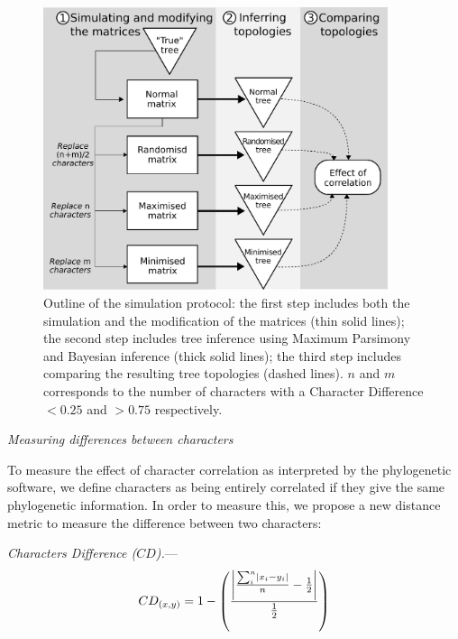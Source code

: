 \documentclass[12pt,letterpaper]{article}
\DeclarePairedDelimiter\abs{\lvert}{\rvert}%
\renewcommand{\subsection}[1]{%
\bigskip
\begin{center}
\begin{large}
\normalfont\itshape #1
\end{large}
\end{center}}
\renewcommand{\subsubsection}[1]{%
\vspace{2ex}
\noindent
\textit{#1.}---}
\begin{document}
\begin{figure}[!htbp]
\centering
   \includegraphics[width=0.9\textwidth]{Figures/outline.pdf}
\caption{Outline of the simulation protocol: the first step includes both the simulation and the modification of the matrices (thin solid lines); the second step includes tree inference using Maximum Parsimony and Bayesian inference (thick solid lines); the third step includes comparing the resulting tree topologies (dashed lines). $n$ and $m$ corresponds to the number of characters with a Character Difference $<0.25$ and $>0.75$ respectively.}
\label{Fig:outline}
\end{figure}

\subsection{Measuring differences between characters}
\label{CD_description}
To measure the effect of character correlation as interpreted by the phylogenetic software, we define characters as being entirely correlated if they give the same phylogenetic information.
In order to measure this, we propose a new distance metric to measure the difference between two characters:

\subsubsection{Characters Difference ($CD$)}
\begin{equation}
    CD_{(x,y)} = 1 - \left(\frac{\abs*{\frac{\sum_{i}^{n}\abs{x_{i} - y_{i}}}{n}-\frac{1}{2}}}{\frac{1}{2}}\right)
\end{equation}
\end{document}
